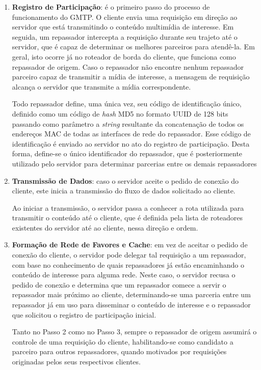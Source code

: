 \begin{enumerate}
\item \textbf{Registro de Participação}: é o primeiro passo do processo de funcionamento do GMTP. O cliente envia uma requisição em direção ao servidor que está transmitindo o conteúdo multimídia de interesse. 
Em seguida, um repassador intercepta a requisição durante seu trajeto até o servidor, que é capaz de determinar os melhores parceiros para atendê-la. Em geral, isto ocorre já no roteador de borda do cliente, que funciona como repassador de origem.
Caso o repassador não encontre nenhum repassador parceiro capaz de transmitir a mídia de interesse, a mensagem de requisição alcança o servidor que transmite a mídia correspondente.

Todo repassador define, uma única vez, seu código de identificação único, definido como um código de \textit{hash} MD5 no formato UUID de 128 bits passando como parâmetro a \emph{string} resultante da concatenação de todos os endereços MAC de todas as interfaces de rede do repassador. Esse código de identificação é enviado ao servidor no ato do registro de participação.
Desta forma, define-se o único identificador do repassador, que é posteriormente utilizado pelo servidor para determinar parcerias entre os demais repassadores

\item \textbf{Transmissão de Dados}: caso o servidor aceite o pedido de conexão do cliente, este inicia a transmissão do fluxo de dados solicitado ao cliente. 

Ao iniciar a transmissão, o servidor passa a conhecer a rota utilizada para transmitir o conteúdo até o cliente, que é definida pela lista de roteadores existentes do servidor até ao cliente, nessa direção e ordem.

\item \textbf{Formação de Rede de Favores e Cache}: em vez de aceitar o pedido de conexão do cliente, o servidor pode delegar tal requisição a um repassador, com base no conhecimento de quais repassadores já estão encaminhando o conteúdo de interesse para alguma rede.
Neste caso, o servidor recusa o pedido de conexão e determina que um repassador comece a servir o repassador mais próximo ao cliente, determinando-se uma parceria entre um repassador já em uso para disseminar o conteúdo de interesse e o repassador que solicitou o registro de participação inicial.

Tanto no Passo 2 como no Passo 3, sempre o repassador de origem assumirá o controle de uma requisição do cliente, habilitando-se como candidato a parceiro para outros repassadores, quando motivados por requisições originadas pelos seus respectivos clientes.


\end{enumerate}
